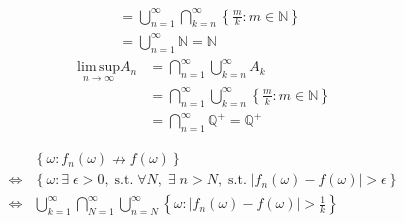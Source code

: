 \begin{list}{1.9.}{}
\[\begin{aligned}
      &= \bigcup\limits_{n=1}^\infty \bigcap\limits_{k=n}^\infty \left\{
        \frac{m}{k}:m\in\mathbb{N}
      \right\}    \\
      &= \bigcup\limits_{n=1}^\infty \mathbb{N} = \mathbb{N}
    \end{aligned}
  \]
  \[
    \begin{aligned}
      \underset{n\to\infty}{\mathrm{lim\,sup}} A_n &= \bigcap\limits_{n=1}^\infty \bigcup\limits_{k=n}^\infty A_k    \\
      &= \bigcap\limits_{n=1}^\infty \bigcup\limits_{k=n}^\infty \left\{
        \frac{m}{k}:m\in\mathbb{N}
      \right\}    \\
      &= \bigcap\limits_{n=1}^\infty\mathbb{Q^+} = \mathbb{Q^+}
    \end{aligned}
  \]
  
\item
  \[
    \begin{aligned}
      & \left\{\omega:f_n\left(\omega\right)\nrightarrow f\left(\omega\right)\right\}    \\
      \iff & \left\{\omega: \exists\;\epsilon > 0,\;\mathrm{s.t.}\;\forall N,\;\exists\;n>N,\;\mathrm{s.t.}\;
        \left|f_n\left(\omega\right) - f\left(\omega\right)\right|>\epsilon
      \right\}    \\
      \iff & \bigcup\limits_{k=1}^\infty\bigcap\limits_{N=1}^\infty\bigcup\limits_{n=N}^\infty
      \left\{
        \omega:\left|f_n\left(\omega\right) - f\left(\omega\right)\right| > \frac{1}{k}
      \right\}
    \end{aligned}
  \]
  

\end{list}
